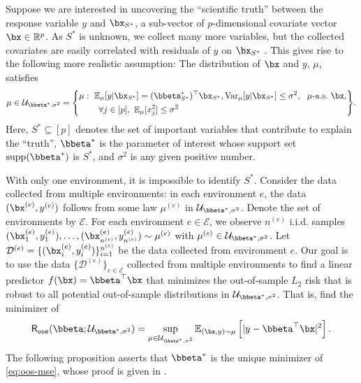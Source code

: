 \documentclass[10pt]{article}
\numberwithin{equation}{section}
\newcommand*{\supp}{\mathrm{supp}}
\newcommand{\aosversion}[2]{\iftoggle{vaos}{#1}{#2}}
\newcommand{\blue}[1]{{\color{blue} #1}}
\begin{document}
{Suppose we are interested in uncovering the ``scientific truth'' between the response variable $y$ and $\bx_{S^*}$, a sub-vector of $p$-dimensional covariate vector $\bx \in \mathbb{R}^p$. As $S^*$ is unknown, we collect many more variables, but the collected covariates are easily correlated with residuals of $y$ on $\bx_{S^*}$ \citep{fan2014endogeneity, fan2014challenges}. This gives rise to the following more realistic assumption: The distribution of $\bx$ and $y$, $\mu$, satisfies
\begin{align}
\label{eq:true-law-set}
    \mu \in \mathcal{U}_{\bbeta^*, \sigma^2} = \Bigg\{\begin{split}\mu&: ~\mathbb{E}_\mu[y|\bx_{S^*} ] = (\bbeta^*_{S^*})^\top \bx_{S^*}, \text{Var}_{\mu}[y|\bx_{S^*}] \le \sigma^2, ~~ \mu\text{-a.s.} ~ \bx, \\
    &~~~~~\forall j \in [p], ~ \mathbb{E}_{\mu}[x_j^2] \le \sigma^2
    \end{split}
    \Bigg\}.
\end{align} Here, $S^* \subseteq [p]$ denotes the set of important variables that contribute to explain the ``truth'',  $\bbeta^*$ is the parameter of interest whose support set $\supp(\bbeta^*)$ is $S^*$, and $\sigma^2$ is any given positive number.

With only one environment, it is impossible to identify $S^*$.
Consider the data collected from multiple environments: in each environment $e$, the data $(\bx^{(e)}, y^{(e)})$ follows from some law $\mu^{(e)}$ in $\mathcal{U}_{\bbeta^*, \sigma^2}$. Denote the set of environments by $\mathcal{E}$. For each environment $e\in \mathcal{E}$, we observe $n^{(e)}$ i.i.d. samples $(\bx^{(e)}_1,y^{(e)}_1),\ldots, (\bx^{(e)}_{n^{(e)}}, y^{(e)}_{n^{(e)}})  \sim \mu^{(e)}$ with $\mu^{(e)} \in \mathcal{U}_{\bbeta^*, \sigma^2}$. Let $\mathcal{D}^{(e)} = \{(\bx_i^{(e)}, y_i^{(e)})\}_{i=1}^{n^{(e)}}$ be the data collected from environment $e$. Our goal is to use the data $\{\mathcal{D}^{(e)}\}_{e\in \mathcal{E}}$ collected from multiple environments to find a linear predictor $f(\bx) = \bbeta^\top \bx$ that  minimizes the out-of-sample $L_2$ risk that is robust to all potential out-of-sample distributions in $\mathcal{U}_{\bbeta^*, \sigma^2}$. That is, find the minimizer of
\begin{align}
\label{eq:oos-mse}
    \mathsf{R}_{\mathtt{oos}}(\bbeta;\mathcal{U}_{\bbeta^*, \sigma^2}) = \sup_{\mu \in \mathcal{U}_{\bbeta^*, \sigma^2}} \mathbb{E}_{(\bx,y)\sim \mu} \left[ |y - \bbeta^\top \bx|^2 \right].
\end{align}
The following proposition asserts that $\bbeta^*$ is the unique minimizer of \eqref{eq:oos-mse}, whose proof is given in \aosversion{Appendix~\blue{B.1}}{\cref{prop:oos-definition-property-proof}}.

}
\end{document}

